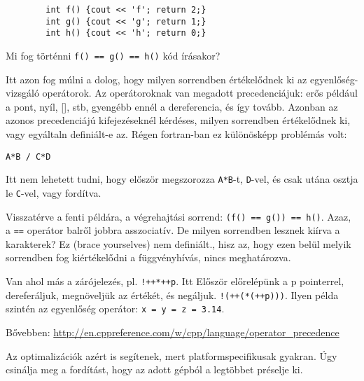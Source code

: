 \documentclass[a4paper,11.5pt]{article}
\begin{document}
		
		\begin{lstlisting}
		int f() {cout << 'f'; return 2;}
		int g() {cout << 'g'; return 1;}
		int h() {cout << 'h'; return 0;}
		\end{lstlisting}
		Mi fog történni \texttt{f() == g() == h()} kód írásakor?
		
		Itt azon fog múlni a dolog, hogy milyen sorrendben értékelődnek ki az egyenlőség-vizsgáló operátorok. Az operátoroknak van megadott precedenciájuk: erős például a pont, nyíl, [], stb, gyengébb ennél a dereferencia, és így tovább. Azonban az azonos precedenciájú kifejezéseknél kérdéses, milyen sorrendben értékelődnek ki, vagy egyáltaln definiált-e az. Régen fortran-ban ez különösképp problémás volt:
		
		\begin{center}
			\texttt{A*B / C*D}
		\end{center}Itt nem lehetett tudni, hogy először megszorozza \texttt{A*B}-t, \texttt{D}-vel, és csak utána osztja le \texttt{C}-vel, vagy fordítva.
		
		Visszatérve a fenti példára, a végrehajtási sorrend:
		\texttt{(f() == g()) == h()}. Azaz, a \texttt{==} operátor balről jobbra asszociatív. De milyen sorrendben lesznek kiírva a karakterek? Ez (brace yourselves) nem definiált., hisz az, hogy ezen belül melyik sorrendben fog kiértékelődni a függvényhívás, nincs meghatározva.
		
		Van ahol más a zárójelezés, pl. \texttt{!++*++p}. Itt Először előrelépünk a p pointerrel, dereferáljuk, megnöveljük az értékét, és negáljuk. \texttt{!(++(*(++p)))}. Ilyen példa szintén az egyenlőség operátor: \texttt{x = y = z = 3.14}. 
		\begin{note}
			Bővebben: \url{http://en.cppreference.com/w/cpp/language/operator_precedence}
		\end{note}
	Az optimalizációk azért is segítenek, mert platformspecifikusak gyakran. Úgy csinálja meg a fordítást, hogy az adott gépból a legtöbbet préselje ki.
	
\end{document}

